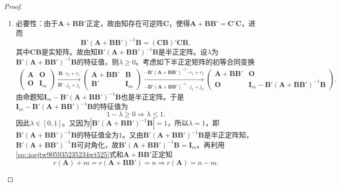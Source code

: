 \documentclass[../../main.tex]{subfiles}%
\begin{document}
\begin{proof}
\begin{enumerate}[(1)]
\item {\heiti 必要性：}由于$\boldsymbol{A}+\boldsymbol{BB}'$正定，故由知存在可逆阵$\boldsymbol{C}$，使得$\boldsymbol{A}+\boldsymbol{BB}'=\boldsymbol{C}'\boldsymbol{C}$，进而
$$\boldsymbol{B}'\left( \boldsymbol{A}+\boldsymbol{BB}' \right) ^{-1}\boldsymbol{B}=\left( \boldsymbol{CB} \right) '\boldsymbol{CB},$$
其中$\boldsymbol{CB}$是实矩阵。故由知$\boldsymbol{B}'\left( \boldsymbol{A}+\boldsymbol{BB}' \right) ^{-1}\boldsymbol{B}$是半正定阵。设$\lambda$为$\boldsymbol{B}'\left( \boldsymbol{A}+\boldsymbol{BB}' \right) ^{-1}\boldsymbol{B}$的特征值，则$\lambda \geqslant 0$。考虑如下半正定矩阵的初等合同变换
\begin{align}
\begin{pmatrix} 
\boldsymbol{A} & \boldsymbol{O} \\ 
\boldsymbol{O} & \boldsymbol{I}_m 
\end{pmatrix} 
\xrightarrow[\boldsymbol{B}' \cdot j_2 + j_1]{\boldsymbol{B} \cdot r_2 + r_1} 
\begin{pmatrix} 
\boldsymbol{A} + \boldsymbol{BB}' & \boldsymbol{B} \\ 
\boldsymbol{B}' & \boldsymbol{I}_m 
\end{pmatrix} 
\xrightarrow[-\boldsymbol{B}'(\boldsymbol{A} + \boldsymbol{BB}')^{-1} \cdot j_1 + j_2]{-\boldsymbol{B}'(\boldsymbol{A} + \boldsymbol{BB}')^{-1} \cdot r_1 + r_2} 
\begin{pmatrix} 
\boldsymbol{A} + \boldsymbol{BB}' & \boldsymbol{O} \\ 
\boldsymbol{O} & \boldsymbol{I}_m - \boldsymbol{B}'(\boldsymbol{A} + \boldsymbol{BB}')^{-1}\boldsymbol{B} 
\end{pmatrix}. \label{eq::ioejtw905935235234wt525}
\end{align}
由命题知$\boldsymbol{I}_m-\boldsymbol{B}'\left( \boldsymbol{A}+\boldsymbol{BB}' \right) ^{-1}\boldsymbol{B}$也是半正定阵。于是$\boldsymbol{I}_m-\boldsymbol{B}'\left( \boldsymbol{A}+\boldsymbol{BB}' \right) ^{-1}\boldsymbol{B}$的特征值为
$$1-\lambda \geqslant 0\Longrightarrow \lambda \leqslant 1.$$
因此$\lambda \in \left[ 0,1 \right]$。又因为$\left| \boldsymbol{B}'\left( \boldsymbol{A}+\boldsymbol{BB}' \right) ^{-1}\boldsymbol{B} \right|=1$，所以$\lambda =1$，即$\boldsymbol{B}'\left( \boldsymbol{A}+\boldsymbol{BB}' \right) ^{-1}\boldsymbol{B}$的特征值全为$1$。又由$\boldsymbol{B}'\left( \boldsymbol{A}+\boldsymbol{BB}' \right) ^{-1}\boldsymbol{B}$是半正定阵知，$\boldsymbol{B}'\left( \boldsymbol{A}+\boldsymbol{BB}' \right) ^{-1}\boldsymbol{B}$可对角化，故$\boldsymbol{B}'\left( \boldsymbol{A}+\boldsymbol{BB}' \right) ^{-1}\boldsymbol{B}=\boldsymbol{I}_m$。再利用\eqref{eq::ioejtw905935235234wt525}式和$\boldsymbol{A}+\boldsymbol{BB}'$正定知
$$r\left( \boldsymbol{A} \right) +m=r\left( \boldsymbol{A}+\boldsymbol{BB}' \right) =n\Longrightarrow r\left( \boldsymbol{A} \right) =n-m.$$



\end{enumerate}
\end{proof}
\end{document}
